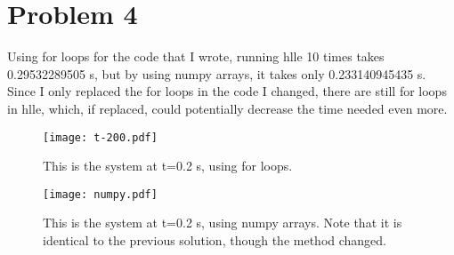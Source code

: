 \documentclass[11pt,letterpaper]{article}
\begin{document}
\section*{Problem 4}

Using for loops for the code that I wrote, running hlle 10 times takes 0.29532289505 s, but by using numpy arrays, it takes only 0.233140945435 s. Since I only replaced the for loops in the code I changed, there are still for loops in hlle, which, if replaced, could potentially decrease the time needed even more.

\begin{figure}[bth]
\centering
\texttt{[image: t-200.pdf]}
\caption{This is the system at t=0.2 s, using for loops.}
\label{fig:simpleplot2}
\end{figure}

\begin{figure}[bth]
\centering
\texttt{[image: numpy.pdf]}
\caption{This is the system at t=0.2 s, using numpy arrays. Note that it is identical to the previous solution, though the method changed.}
\label{fig:simpleplot2}
\end{figure}
\end{document}
